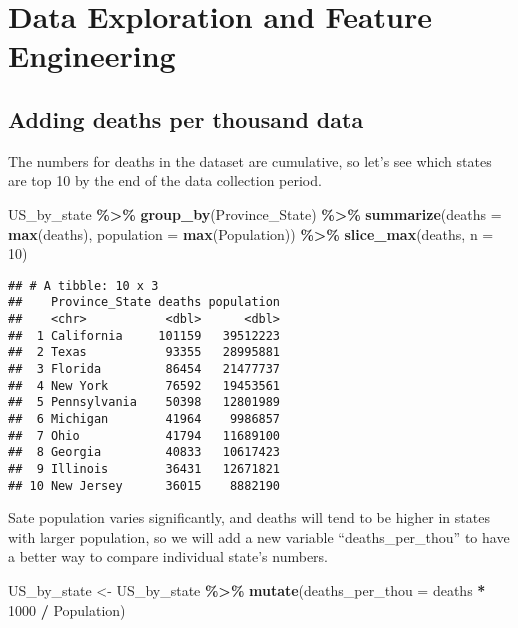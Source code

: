 \documentclass[
]{article}
\newenvironment{Shaded}{\begin{snugshade}}{\end{snugshade}}
\newcommand{\AttributeTok}[1]{\textcolor[rgb]{0.13,0.29,0.53}{#1}}
\newcommand{\DecValTok}[1]{\textcolor[rgb]{0.00,0.00,0.81}{#1}}
\newcommand{\FunctionTok}[1]{\textcolor[rgb]{0.13,0.29,0.53}{\textbf{#1}}}
\newcommand{\NormalTok}[1]{#1}
\newcommand{\OtherTok}[1]{\textcolor[rgb]{0.56,0.35,0.01}{#1}}
\newcommand{\SpecialCharTok}[1]{\textcolor[rgb]{0.81,0.36,0.00}{\textbf{#1}}}
\begin{document}
\hypertarget{data-exploration-and-feature-engineering}{%
\section{Data Exploration and Feature
Engineering}\label{data-exploration-and-feature-engineering}}

\hypertarget{adding-deaths-per-thousand-data}{%
\subsection{Adding deaths per thousand
data}\label{adding-deaths-per-thousand-data}}

The numbers for deaths in the dataset are cumulative, so let's see which
states are top 10 by the end of the data collection period.

\begin{Shaded}
\begin{Highlighting}[]
\NormalTok{US\_by\_state }\SpecialCharTok{\%\textgreater{}\%}
  \FunctionTok{group\_by}\NormalTok{(Province\_State) }\SpecialCharTok{\%\textgreater{}\%}
  \FunctionTok{summarize}\NormalTok{(}\AttributeTok{deaths =} \FunctionTok{max}\NormalTok{(deaths), }\AttributeTok{population =} \FunctionTok{max}\NormalTok{(Population)) }\SpecialCharTok{\%\textgreater{}\%}
  \FunctionTok{slice\_max}\NormalTok{(deaths, }\AttributeTok{n =} \DecValTok{10}\NormalTok{)}
\end{Highlighting}
\end{Shaded}

\begin{verbatim}
## # A tibble: 10 x 3
##    Province_State deaths population
##    <chr>           <dbl>      <dbl>
##  1 California     101159   39512223
##  2 Texas           93355   28995881
##  3 Florida         86454   21477737
##  4 New York        76592   19453561
##  5 Pennsylvania    50398   12801989
##  6 Michigan        41964    9986857
##  7 Ohio            41794   11689100
##  8 Georgia         40833   10617423
##  9 Illinois        36431   12671821
## 10 New Jersey      36015    8882190
\end{verbatim}

Sate population varies significantly, and deaths will tend to be higher
in states with larger population, so we will add a new variable
``deaths\_per\_thou'' to have a better way to compare individual state's
numbers.

\begin{Shaded}
\begin{Highlighting}[]
\NormalTok{US\_by\_state }\OtherTok{\textless{}{-}}\NormalTok{ US\_by\_state }\SpecialCharTok{\%\textgreater{}\%}
  \FunctionTok{mutate}\NormalTok{(}\AttributeTok{deaths\_per\_thou =}\NormalTok{ deaths }\SpecialCharTok{*} \DecValTok{1000} \SpecialCharTok{/}\NormalTok{ Population)}
\end{Highlighting}
\end{Shaded}
\end{document}
